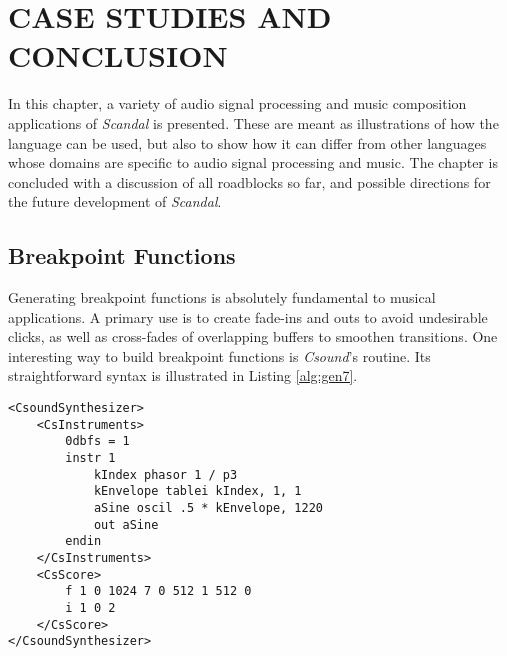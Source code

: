 \chapter{CASE STUDIES AND CONCLUSION}

In this chapter, a variety of audio signal processing and music composition applications of \emph{Scandal} is presented. These are meant as illustrations of how the language can be used, but also to show how it can differ from other languages whose domains are specific to audio signal processing and music. The chapter is concluded with a discussion of all roadblocks so far, and possible directions for the future development of \emph{Scandal}.


\section{Breakpoint Functions}

Generating breakpoint functions is absolutely fundamental to musical applications. A primary use is to create fade-ins and outs to avoid undesirable clicks, as well as cross-fades of overlapping buffers to smoothen transitions. One interesting way to build breakpoint functions is \emph{Csound}'s  routine. Its straightforward syntax is illustrated in Listing \ref{alg:gen7}.

\begin{lstlisting}[emph={instr,endin,phasor,tablei,oscil,out,f,i},emphstyle={\textbf},caption={Enveloping an audio buffer in \emph{Csound} with \il{GEN7}.},label={alg:gen7}]
<CsoundSynthesizer>
	<CsInstruments>
		0dbfs = 1
		instr 1
			kIndex phasor 1 / p3
			kEnvelope tablei kIndex, 1, 1
			aSine oscil .5 * kEnvelope, 1220
			out aSine
		endin
	</CsInstruments>
	<CsScore>
		f 1 0 1024 7 0 512 1 512 0
		i 1 0 2
	</CsScore>
</CsoundSynthesizer>
\end{lstlisting}

